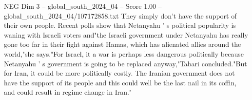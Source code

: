 \begin{textsample}{NEG Dim 3 – global\_south\_2024\_04 – Score 1.00 – global\_south\_2024\_04/107172858.txt}
They simply don't have the support of their own people.
Recent polls show that Netanyahu ' s political popularity is waning with Israeli voters and"the Israeli government under Netanyahu has really gone too far in their fight against Hamas, which has alienated allies around the world,"she says."For Israel, it a war is perhaps less dangerous politically because Netanyahu ' s government is going to be replaced anyway,"Tabari concluded."But for Iran, it could be more politically costly.
The Iranian government does not have the support of its people and this could well be the last nail in its coffin, and could result in regime change in Iran."

\end{textsample}
